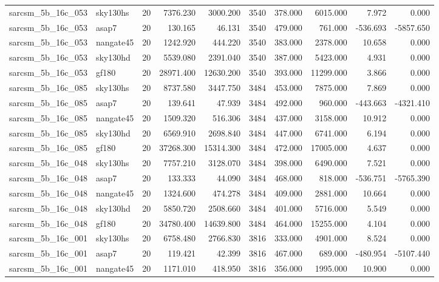 \begin{longtable}{llrrrrrrrr}
sarcsm\_5b\_16c\_053 & sky130hs & 20 & 7376.230 & 3000.200 & 3540 & 378.000 & 6015.000 & 7.972 & 0.000 \\
sarcsm\_5b\_16c\_053 & asap7 & 20 & 130.165 & 46.131 & 3540 & 479.000 & 761.000 & -536.693 & -5857.650 \\
sarcsm\_5b\_16c\_053 & nangate45 & 20 & 1242.920 & 444.220 & 3540 & 383.000 & 2378.000 & 10.658 & 0.000 \\
sarcsm\_5b\_16c\_053 & sky130hd & 20 & 5539.080 & 2391.040 & 3540 & 387.000 & 5423.000 & 4.931 & 0.000 \\
sarcsm\_5b\_16c\_053 & gf180 & 20 & 28971.400 & 12630.200 & 3540 & 393.000 & 11299.000 & 3.866 & 0.000 \\
sarcsm\_5b\_16c\_085 & sky130hs & 20 & 8737.580 & 3447.750 & 3484 & 453.000 & 7875.000 & 7.869 & 0.000 \\
sarcsm\_5b\_16c\_085 & asap7 & 20 & 139.641 & 47.939 & 3484 & 492.000 & 960.000 & -443.663 & -4321.410 \\
sarcsm\_5b\_16c\_085 & nangate45 & 20 & 1509.320 & 516.306 & 3484 & 437.000 & 3158.000 & 10.912 & 0.000 \\
sarcsm\_5b\_16c\_085 & sky130hd & 20 & 6569.910 & 2698.840 & 3484 & 447.000 & 6741.000 & 6.194 & 0.000 \\
sarcsm\_5b\_16c\_085 & gf180 & 20 & 37268.300 & 15314.300 & 3484 & 472.000 & 17005.000 & 4.637 & 0.000 \\
sarcsm\_5b\_16c\_048 & sky130hs & 20 & 7757.210 & 3128.070 & 3484 & 398.000 & 6490.000 & 7.521 & 0.000 \\
sarcsm\_5b\_16c\_048 & asap7 & 20 & 133.333 & 44.090 & 3484 & 468.000 & 818.000 & -536.751 & -5765.390 \\
sarcsm\_5b\_16c\_048 & nangate45 & 20 & 1324.600 & 474.278 & 3484 & 409.000 & 2881.000 & 10.664 & 0.000 \\
sarcsm\_5b\_16c\_048 & sky130hd & 20 & 5850.720 & 2508.660 & 3484 & 401.000 & 5716.000 & 5.549 & 0.000 \\
sarcsm\_5b\_16c\_048 & gf180 & 20 & 34780.400 & 14639.800 & 3484 & 464.000 & 15255.000 & 4.104 & 0.000 \\
sarcsm\_5b\_16c\_001 & sky130hs & 20 & 6758.480 & 2766.830 & 3816 & 333.000 & 4901.000 & 8.524 & 0.000 \\
sarcsm\_5b\_16c\_001 & asap7 & 20 & 119.421 & 42.399 & 3816 & 467.000 & 689.000 & -480.954 & -5107.440 \\
sarcsm\_5b\_16c\_001 & nangate45 & 20 & 1171.010 & 418.950 & 3816 & 356.000 & 1995.000 & 10.900 & 0.000 \\

\end{longtable}
